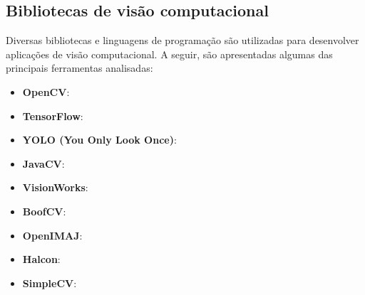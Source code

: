 \subsection{Bibliotecas de visão computacional}
Diversas bibliotecas e linguagens de programação são utilizadas para desenvolver aplicações de visão computacional. A seguir, são apresentadas algumas das principais ferramentas analisadas:
\begin{itemize}
    \item \textbf{OpenCV}:
    \item \textbf{TensorFlow}: 
    \item \textbf{YOLO (You Only Look Once)}: 
    \item \textbf{JavaCV}: 
    \item \textbf{VisionWorks}: 
    \item \textbf{BoofCV}: 
    \item \textbf{OpenIMAJ}: 
    \item \textbf{Halcon}: 
    \item \textbf{SimpleCV}: 
    
\end{itemize}

